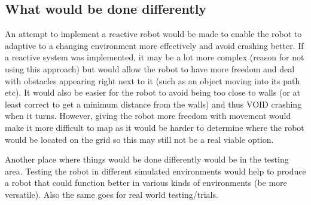 \documentclass[a4paper,12pt]{article}
\begin{document}
\subsection{What would be done differently}
\noindent An attempt to implement a reactive robot would be made to enable the robot to adaptive to a changing environment more effectively and avoid crashing better. If a reactive system was implemented, it may be a lot more complex (reason for not using this approach) but would allow the robot to have more freedom and deal with obstacles appearing right next to it (such as an object moving into its path etc). It would also be easier for the robot to avoid being too close to walls (or at least correct to get a minimum distance from the walls) and thus VOID crashing when it turns. However, giving the robot more freedom with movement would make it more difficult to map as it would be harder to determine where the robot would be located on the grid so this may still not be a real viable option.

\vspace{5mm}
\noindent Another place where things would be done differently would be in the testing area. Testing the robot in different simulated environments would help to produce a robot that could function better in various kinds of environments (be more versatile). Also the same goes for real world testing/trials.
\end{document}
